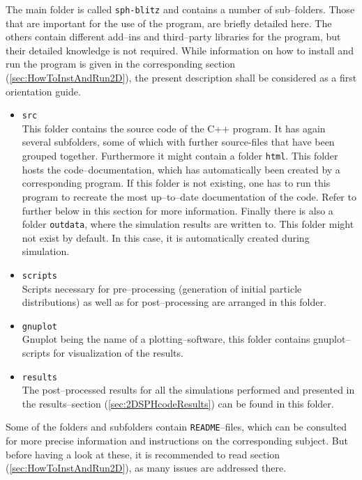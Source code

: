 \documentclass[11pt,a4paper,twoside]{report}
\begin{document}
The main folder is called {\tt sph-blitz} and contains a number of sub--folders. Those that are important for the use of the program, are briefly detailed here. The others contain different add--ins and third--party libraries for the program, but their detailed knowledge is not required.
While information on how to install and run the program is given in the corresponding section (\ref{sec:HowToInstAndRun2D}), the present description shall be considered as a first orientation guide. 
\begin{itemize}
 \item {\tt src}\\
This folder contains the source code of the C++ program. It has again several subfolders, some of which with further source-files that have been grouped together.
Furthermore it might contain a folder {\tt html}. This folder hosts the code--documentation, which has automatically been created by a corresponding program. If this folder is not existing, one has to run this program to recreate the most up--to--date documentation of the code. Refer to further below in this section for more information.
Finally there is also a folder {\tt outdata}, where the simulation results are written to. This folder might not exist by default. In this case, it is automatically created during simulation. 
\item {\tt scripts}\\
Scripts necessary for pre--processing (generation of initial particle distributions) as well as for post--processing  are arranged in this folder.
\item{\tt gnuplot}\\
Gnuplot being the name of a plotting--software, this folder contains gnuplot--scripts for visualization of the results.
\item{\tt results}\\
The post--processed results for all the simulations performed and presented in the results--section (\ref{sec:2DSPHcodeResults}) can be found in this folder. 


\end{itemize}
Some of the folders and subfolders contain {\tt README}--files, which can be consulted for more precise information and instructions on the corresponding subject. But before having a look at these, it is recommended to read section (\ref{sec:HowToInstAndRun2D}), as many issues are addressed there.
\end{document}

